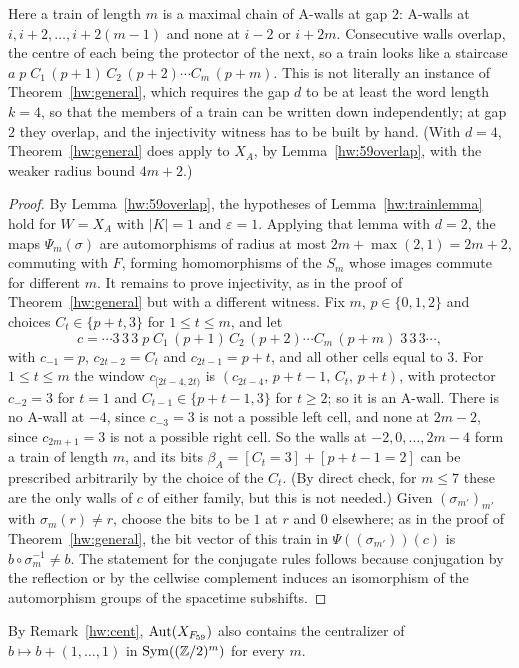 Here a train of length $m$ is a maximal chain of A-walls at gap $2$: A-walls at $i,i+2,\dots,i+2(m-1)$ and none at $i-2$ or $i+2m$. Consecutive walls overlap, the centre of each being the protector of the next, so a train looks like a staircase $a\;p\;C_1\,(p+1)\,C_2\,(p+2)\cdots C_m\,(p+m)$. This is not literally an instance of Theorem~\ref{hw:general}, which requires the gap $d$ to be at least the word length $k=4$, so that the members of a train can be written down independently; at gap $2$ they overlap, and the injectivity witness has to be built by hand. (With $d=4$, Theorem~\ref{hw:general} does apply to $X_A$, by Lemma~\ref{hw:59overlap}, with the weaker radius bound $4m+2$.)

\begin{proof}
By Lemma~\ref{hw:59overlap}, the hypotheses of Lemma~\ref{hw:trainlemma} hold for $W=X_A$ with $|K|=1$ and $\varepsilon=1$. Applying that lemma with $d=2$, the maps $\Psi_m(\sigma)$ are automorphisms of radius at most $2m+\max(2,1)=2m+2$, commuting with $F$, forming homomorphisms of the $S_m$ whose images commute for different $m$. It remains to prove injectivity, as in the proof of Theorem~\ref{hw:general} but with a different witness. Fix $m$, $p\in\{0,1,2\}$ and choices $C_t\in\{p+t,3\}$ for $1\le t\le m$, and let
\[
c=\cdots3\,3\,3\;p\;C_1\,(p+1)\,C_2\,(p+2)\cdots C_m\,(p+m)\;3\,3\,3\cdots,
\]
with $c_{-1}=p$, $c_{2t-2}=C_t$ and $c_{2t-1}=p+t$, and all other cells equal to $3$. For $1\le t\le m$ the window $c_{[2t-4,2t)}$ is $(c_{2t-4},\,p+t-1,\,C_t,\,p+t)$, with protector $c_{-2}=3$ for $t=1$ and $C_{t-1}\in\{p+t-1,3\}$ for $t\ge2$; so it is an A-wall. There is no A-wall at $-4$, since $c_{-3}=3$ is not a possible left cell, and none at $2m-2$, since $c_{2m+1}=3$ is not a possible right cell. So the walls at $-2,0,\dots,2m-4$ form a train of length $m$, and its bits $\beta_A=[C_t=3]+[p+t-1=2]$ can be prescribed arbitrarily by the choice of the $C_t$. (By direct check, for $m\le7$ these are the only walls of $c$ of either family, but this is not needed.) Given $(\sigma_{m'})_{m'}$ with $\sigma_m(r)\ne r$, choose the bits to be $1$ at $r$ and $0$ elsewhere; as in the proof of Theorem~\ref{hw:general}, the bit vector of this train in $\Psi((\sigma_{m'}))(c)$ is $b\circ\sigma_m^{-1}\ne b$. The statement for the conjugate rules follows because conjugation by the reflection or by the cellwise complement induces an isomorphism of the automorphism groups of the spacetime subshifts.
\end{proof}

By Remark~\ref{hw:cent}, $\operatorname{Aut}(X_{F_{59}})$ also contains the centralizer of $b\mapsto b+(1,\dots,1)$ in $\operatorname{Sym}((\mathbb{Z}/2)^m)$ for every $m$.

